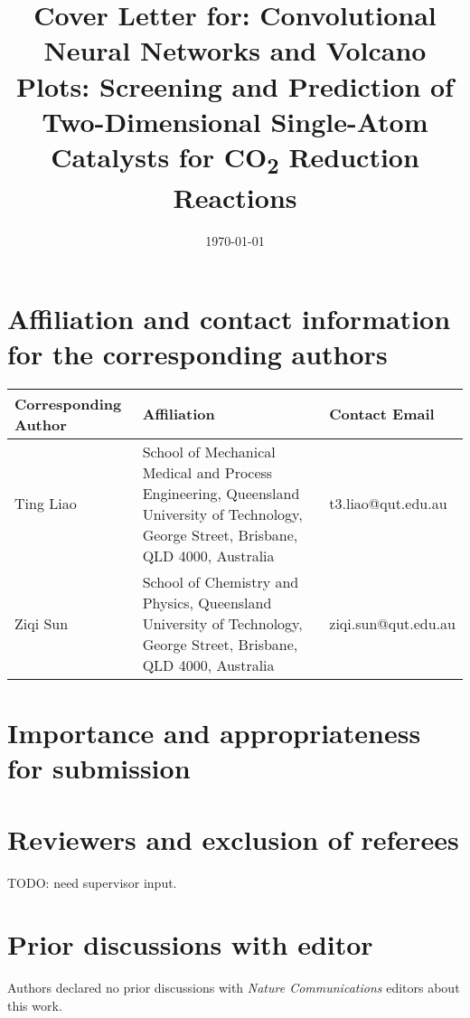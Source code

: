 \documentclass[a4paper, 12pt]{article}
\begin{document}
\title{Cover Letter for: Convolutional Neural Networks and Volcano Plots:
    Screening and Prediction of Two-Dimensional Single-Atom Catalysts
    for CO\textsubscript{2} Reduction Reactions}

\date{\today}
\maketitle
\newpage


\section{Affiliation and contact information for the corresponding authors}

\begin{table}[htbp]
\label{cov_let_table:corr_author_contact}
    \begin{tabularx}{\textwidth}{p{2.5cm}p{6cm}l}
    \toprule
    Corresponding Author  & Affiliation                                             & Contact Email       \\
    \midrule
    Ting Liao             & School of Mechanical Medical and Process Engineering,
                            Queensland University of Technology, George Street,
                            Brisbane, QLD 4000, Australia                           & t3.liao@qut.edu.au   \\
    Ziqi Sun              & School of Chemistry and Physics,
                            Queensland University of Technology, George Street,
                            Brisbane, QLD 4000, Australia                           & ziqi.sun@qut.edu.au  \\
    \bottomrule
    \end{tabularx}
\end{table}


\section{Importance and appropriateness for submission}




\section{Reviewers and exclusion of referees}

TODO: need supervisor input.

\section{Prior discussions with editor}

Authors declared no prior discussions with \textit{Nature Communications} editors about this work.
\end{document}
